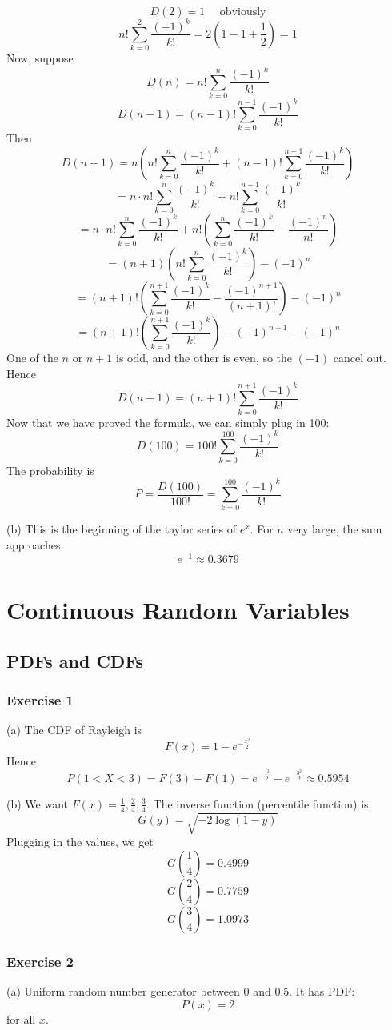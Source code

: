 \documentclass{book}
\begin{document}
$$D(2) = 1 \quad \text{ obviously}$$
$$n! \sum_{k = 0}^2 \frac{(-1)^k}{k!} = 2(1 - 1 + \frac{1}{2}) = 1$$
Now, suppose
$$D(n) = n! \sum_{k = 0}^n \frac{(-1)^k}{k!}$$
$$D(n - 1) = (n - 1)! \sum_{k = 0}^{n - 1} \frac{(-1)^k}{k!}$$
Then
$$D(n + 1) = n \left(n! \sum_{k = 0}^n \frac{(-1)^k}{k!} + (n - 1)! \sum_{k = 0}^{n - 1} \frac{(-1)^k}{k!}\right)$$
$$= n \cdot n! \sum_{k = 0}^n \frac{(-1)^k}{k!} + n! \sum_{k = 0}^{n - 1} \frac{(-1)^k}{k!}$$
$$= n \cdot n! \sum_{k = 0}^n \frac{(-1)^k}{k!} + n! \left( \sum_{k = 0}^n \frac{(-1)^k}{k!} - \frac{(-1)^n}{n!} \right)$$
$$= (n + 1) \left( n! \sum_{k = 0}^n \frac{(-1)^k}{k!} \right) - (-1)^n$$
$$= (n + 1)! \left( \sum_{k = 0}^{n + 1} \frac{(-1)^k}{k!} - \frac{(-1)^{n + 1}}{(n + 1)!} \right) - (-1)^n$$
$$= (n + 1)! \left( \sum_{k = 0}^{n + 1} \frac{(-1)^k}{k!} \right) - (-1)^{n + 1} - (-1)^n$$
One of the $n$ or $n + 1$ is odd, and the other is even, so the $(-1)$ cancel out. Hence
$$D(n + 1) = (n + 1)! \sum_{k = 0}^{n + 1} \frac{(-1)^k}{k!}$$
Now that we have proved the formula, we can simply plug in 100:
$$D(100) = 100! \sum_{k = 0}^{100} \frac{(-1)^k}{k!}$$
The probability is
$$P = \frac{D(100)}{100!} = \sum_{k = 0}^{100} \frac{(-1)^k}{k!}$$

\noindent
(b) This is the beginning of the taylor series of $e^x$. For $n$ very large, the sum approaches
$$e^{-1} \approx 0.3679$$

\chapter{Continuous Random Variables}

\section{PDFs and CDFs}

\subsection*{Exercise 1}
(a) The CDF of Rayleigh is
$$F(x) = 1 - e^{-\frac{x^2}{2}}$$
Hence
$$P(1 < X < 3) = F(3) - F(1) = e^{-\frac{1^2}{2}} - e^{-\frac{3^2}{2}} \approx 0.5954$$

\noindent
(b) We want $F(x) = \frac{1}{4}, \frac{2}{4}, \frac{3}{4}$. The inverse function (percentile function) is
$$G(y) = \sqrt{-2\log(1 - y)}$$
Plugging in the values, we get
$$G\left(\frac{1}{4}\right) = 0.4999$$
$$G\left(\frac{2}{4}\right) = 0.7759$$
$$G\left(\frac{3}{4}\right) = 1.0973$$

\subsection*{Exercise 2}
(a) Uniform random number generator between 0 and 0.5. It has PDF:
$$P(x) = 2$$
for all $x$.
\end{document}
